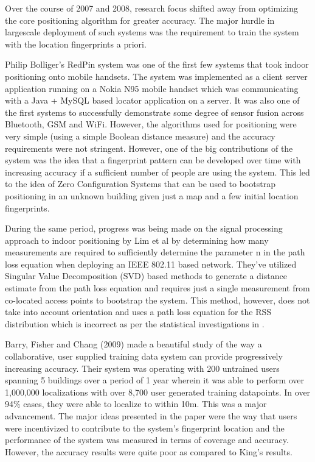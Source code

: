 Over the course of 2007 and 2008, research focus shifted away from optimizing the core positioning algorithm for greater accuracy. The major hurdle in largescale deployment of such systems was the requirement to train the system with the location fingerprints a priori. 

Philip Bolliger’s RedPin system  was one of the first few systems that took indoor positioning onto mobile handsets. The system was implemented as a client server application running on a Nokia N95 mobile handset which was communicating with a Java + MySQL based locator application on a server. It was also one of the first systems to successfully demonstrate some degree of sensor fusion across Bluetooth, GSM and WiFi. However, the algorithms used for positioning were very simple (using a simple Boolean distance measure) and the accuracy requirements were not stringent. However, one of the big contributions of the system was the idea that a fingerprint pattern can be developed over time with increasing accuracy if a sufficient number of people are using the system. This led to the idea of Zero Configuration Systems that can be used to bootstrap positioning in an unknown building given just a map and a few initial location fingerprints.

During the same period, progress was being made on the signal processing approach to indoor positioning by Lim et al by determining how many measurements are required to sufficiently determine the parameter n in the path loss equation when deploying an IEEE 802.11 based network. They’ve utilized Singular Value Decomposition (SVD) based methods to generate a distance estimate from the path loss equation and requires just a single measurement from co-located access points to bootstrap the system. This method, however, does not take into account orientation and uses a path loss equation for the RSS distribution which is incorrect as per the statistical investigations in .

Barry, Fisher and Chang (2009)  made a beautiful study of the way a collaborative, user supplied training data system can provide progressively increasing accuracy. Their system was operating with 200 untrained users spanning 5 buildings over a period of 1 year wherein it was able to perform over 1,000,000 localizations with over 8,700 user generated training datapoints. In over 94\% cases, they were able to localize to within 10m. This was a major advancement. The major ideas presented in the paper were the way that users were incentivized to contribute to the system’s fingerprint location and the performance of the system was measured in terms of coverage and accuracy. However, the accuracy results were quite poor as compared to King’s results.

